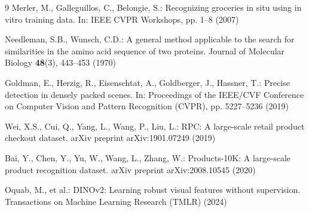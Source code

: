 \documentclass[10pt,a4paper]{article}
\begin{document}
\begin{thebibliography}{9}
Merler, M., Galleguillos, C., Belongie, S.: Recognizing groceries in situ using in vitro training data. In: IEEE CVPR Workshops, pp. 1--8 (2007)

Needleman, S.B., Wunsch, C.D.: A general method applicable to the search for similarities in the amino acid sequence of two proteins. Journal of Molecular Biology \textbf{48}(3), 443--453 (1970)

Goldman, E., Herzig, R., Eisenschtat, A., Goldberger, J., Hassner, T.: Precise detection in densely packed scenes. In: Proceedings of the IEEE/CVF Conference on Computer Vision and Pattern Recognition (CVPR), pp. 5227--5236 (2019)

Wei, X.S., Cui, Q., Yang, L., Wang, P., Liu, L.: RPC: A large-scale retail product checkout dataset. arXiv preprint arXiv:1901.07249 (2019)

Bai, Y., Chen, Y., Yu, W., Wang, L., Zhang, W.: Products-10K: A large-scale product recognition dataset. arXiv preprint arXiv:2008.10545 (2020)

Oquab, M., et al.: DINOv2: Learning robust visual features without supervision. Transactions on Machine Learning Research (TMLR) (2024)
\end{thebibliography}
\end{document}
